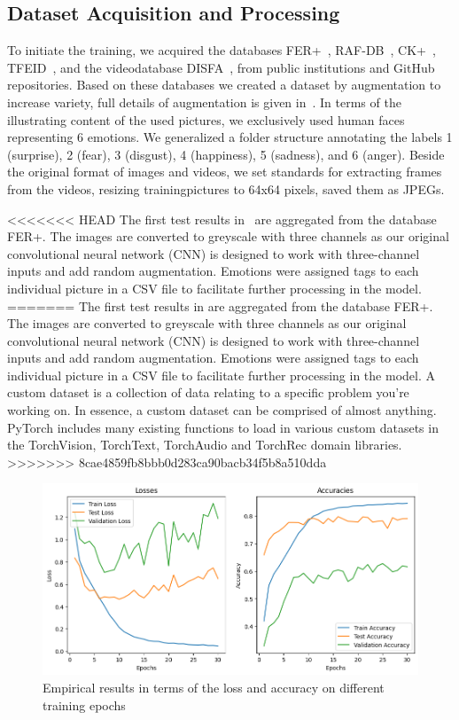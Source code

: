 \subsection{Dataset Acquisition and Processing}
\label{sec:datasets}
To initiate the training, 
we acquired the databases FER+~\cite{BarsoumZCZ16}, RAF-DB~\cite{li2019reliable}, CK+~\cite{LuceyCKSAM10}, TFEID~\cite{tfeid}, and the videodatabase DISFA~\cite{MavadatiMBTC13}, from public institutions and GitHub repositories.
Based on these databases we created a dataset by augmentation to increase variety, 
full details of augmentation is given in~. 
In terms of the illustrating content of the used pictures, we exclusively used human faces representing 6 emotions. We generalized a folder structure annotating the labels 1 (surprise), 2 (fear), 3 (disgust), 4 (happiness), 5 (sadness), and 6 (anger). 
Beside the original format of images and videos, we set standards for extracting frames from the videos, resizing trainingpictures to 64x64 pixels, saved them as JPEGs.

<<<<<<< HEAD
The first test results in~ are aggregated from the database FER+. 
The images are converted to greyscale with three channels as our original convolutional neural network (CNN) is designed to work with three-channel inputs and add random augmentation. 
Emotions were assigned tags to each individual picture in a CSV file to facilitate further processing in the model.
=======
The first test results in  are aggregated from the database FER+. The images are converted to greyscale with three channels as our original convolutional neural network (CNN) is designed to work with three-channel inputs and add random augmentation. Emotions were assigned tags to each individual picture in a CSV file to facilitate further processing in the model.
A custom dataset is a collection of data relating to a specific problem you're working on.
In essence, a custom dataset can be comprised of almost anything.
PyTorch includes many existing functions to load in various custom datasets in the TorchVision, TorchText, TorchAudio and TorchRec domain libraries.
>>>>>>> 8cae4859fb8bbb0d283ca90bacb34f5b8a510dda

\begin{figure}[ht]
  \centering
   \includegraphics[width=\linewidth]{output.png}
   \caption{Empirical results in terms of the loss and accuracy on different training epochs}
   \label{fig:result}
\end{figure}

